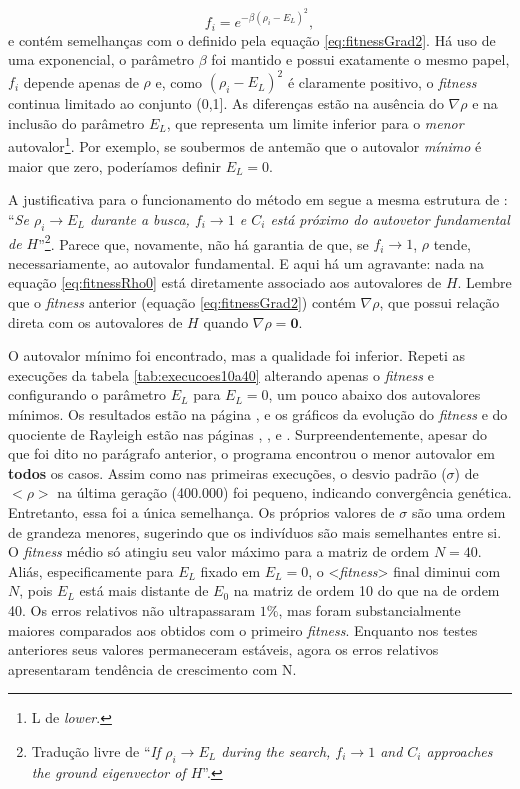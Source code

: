 	\begin{equation}\label{eq:fitnessRho0}
		f_i = e^{-\beta(\rho_i - E_L)^2},
	\end{equation}
e contém semelhanças com o definido pela equação \ref{eq:fitnessGrad2}. Há uso de uma exponencial, o parâmetro $\beta$ foi mantido e possui exatamente o mesmo papel, $f_i$ depende apenas de $\rho$ e, como $(\rho_i - E_L)^2$ é claramente positivo, o \textit{fitness} continua limitado ao conjunto (0,1]. As diferenças estão na ausência do $\nabla \rho$ e na inclusão do parâmetro $E_L$, que representa um limite inferior para o \textit{menor} autovalor\footnote{L de \textit{lower}.}. Por exemplo, se soubermos de antemão que o autovalor \textit{mínimo} é maior que zero, poderíamos definir $E_L = 0$. 

	 A justificativa para o funcionamento do método em \cite{metodo2011} segue a mesma estrutura de \cite{metodo2004}: ``\textit{Se $\rho_i \rightarrow E_L$ durante a busca, $f_i \rightarrow 1$ e $C_i$ está próximo do autovetor fundamental de $H$}''\footnote{Tradução livre de ``\textit{If $\rho_i \rightarrow E_L$ during the search, $f_i \rightarrow 1$ and $C_i$ approaches the ground eigenvector of $H$}''.}. Parece que, novamente, não há garantia de que, se $f_i \rightarrow 1$, $\rho$ tende, necessariamente, ao autovalor fundamental. E aqui há um agravante: nada na equação \ref{eq:fitnessRho0} está diretamente associado aos autovalores de $H$. Lembre que o \textit{fitness} anterior (equação \ref{eq:fitnessGrad2}) contém $\nabla \rho$, que possui relação direta com os autovalores de $H$ quando $\nabla \rho = \textbf{0}$.
	
	O autovalor mínimo foi encontrado, mas a qualidade foi inferior. Repeti as execuções da tabela \ref{tab:execucoes10a40} alterando apenas o \textit{fitness} e configurando o parâmetro $E_L$ para $E_L = 0$, um pouco abaixo dos autovalores mínimos. Os resultados estão na página \pageref{tab:execucoesNovoFitness}, e os gráficos da evolução do \textit{fitness} e do quociente de Rayleigh estão nas páginas \pageref{fig:execucoes_N10_EL}, \pageref{fig:execucoes_N20_EL}, \pageref{fig:execucoes_N30_EL} e \pageref{fig:execucoes_N40_EL}. Surpreendentemente, apesar do que foi dito no parágrafo anterior, o programa encontrou o menor autovalor em \textbf{todos} os casos. Assim como nas primeiras execuções, o desvio padrão ($\sigma$) de $<\rho>$ na última geração (400.000) foi pequeno, indicando convergência genética. Entretanto, essa foi a única semelhança. Os próprios valores de $\sigma$ são uma ordem de grandeza menores, sugerindo que os indivíduos são mais semelhantes entre si. O \textit{fitness} médio só atingiu seu valor máximo para a matriz de ordem $N = 40$. Aliás, especificamente para $E_L$ fixado em $E_L = 0$, o <\textit{fitness}> final diminui com $N$, pois $E_L$ está mais distante de $E_0$ na matriz de ordem 10 do que na de ordem 40. Os erros relativos não ultrapassaram $1\%$, mas foram substancialmente maiores comparados aos obtidos com o primeiro \textit{fitness}. Enquanto nos testes anteriores seus valores permaneceram estáveis, agora os erros relativos apresentaram tendência de crescimento com N.
	
